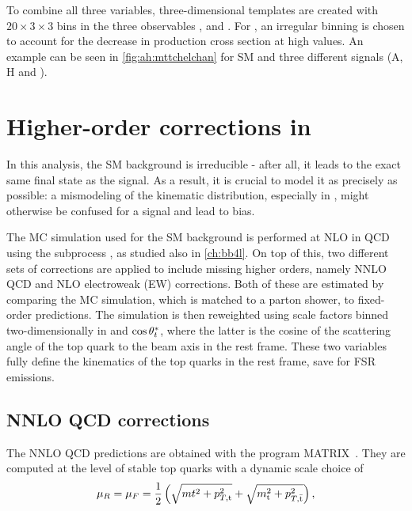 To combine all three variables, three-dimensional templates are created with $20 \times 3 \times 3$ bins in the three observables \mtt, \chel and \chan. For \mtt, an irregular binning is chosen to account for the decrease in production cross section at high values. An example can be seen in \cref{fig:ah:mttchelchan} for SM \ttbar and three different signals (A, H and \etat).

\section{Higher-order corrections in \ttbartitle}
\label{sec:ah:ttbarweights}

In this analysis, the SM \ttbar background is irreducible - after all, it leads to the exact same final state as the signal. As a result, it is crucial to model it as precisely as possible: a mismodeling of the \ttbar kinematic distribution, especially in \mtt, might otherwise be confused for a signal and lead to bias.

The MC simulation used for the SM \ttbar background is performed at NLO in QCD using the \powhegvtwo subprocess \hvq, as studied also in \cref{ch:bb4l}. On top of this, two different sets of corrections are applied to include missing higher orders, namely NNLO QCD and NLO electroweak (EW) corrections. Both of these are estimated by comparing the MC simulation, which is matched to a parton shower, to fixed-order predictions. The simulation is then reweighted using scale factors binned two-dimensionally in \mtt and $\cos \theta^*_t$, where the latter is the cosine of the scattering angle of the top quark to the beam axis in the \ttbar rest frame. These two variables fully define the kinematics of the top quarks in the \ttbar rest frame, save for FSR emissions.%

\subsection{NNLO QCD corrections}

The NNLO QCD predictions are obtained with the program MATRIX~\cite{Grazzini:2017mhc}. They are computed at the level of stable top quarks with a dynamic scale choice of 
\begin{equation}
    \mu_R = \mu_F = \frac{1}{2} \left(\sqrt{mt^2+p_{T,\mathrm{t}}^2} + \sqrt{m_{\mathrm{t}}^2+p_{T,\mathrm{\bar{t}}}^2}\right) , 
\end{equation}

